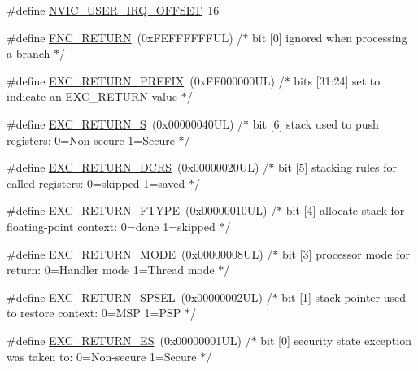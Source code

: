 \begin{DoxyCompactItemize}
\#define \hyperlink{group___c_m_s_i_s___core___n_v_i_c_functions_ga8045d905a5ca57437d8e6f71ffcb6df5}{N\+V\+I\+C\+\_\+\+U\+S\+E\+R\+\_\+\+I\+R\+Q\+\_\+\+O\+F\+F\+S\+ET}~16
\item 
\#define \hyperlink{group___c_m_s_i_s___core___n_v_i_c_functions_gabaa62910bf89acc186ae998c611e64ab}{F\+N\+C\+\_\+\+R\+E\+T\+U\+RN}~(0x\+F\+E\+F\+F\+F\+F\+F\+F\+U\+L)     /$\ast$ bit \mbox{[}0\mbox{]} ignored when processing a branch                             $\ast$/
\item 
\#define \hyperlink{group___c_m_s_i_s___core___n_v_i_c_functions_ga99e0c1c19f050880a8bd827a7f420bec}{E\+X\+C\+\_\+\+R\+E\+T\+U\+R\+N\+\_\+\+P\+R\+E\+F\+IX}~(0x\+F\+F000000\+U\+L)     /$\ast$ bits \mbox{[}31\+:24\mbox{]} set to indicate an E\+X\+C\+\_\+\+R\+E\+T\+U\+R\+N value                     $\ast$/
\item 
\#define \hyperlink{group___c_m_s_i_s___core___n_v_i_c_functions_ga88711355d0196b1ffeb18c33e2c95360}{E\+X\+C\+\_\+\+R\+E\+T\+U\+R\+N\+\_\+S}~(0x00000040\+U\+L)     /$\ast$ bit \mbox{[}6\mbox{]} stack used to push registers\+: 0=\+Non-\/secure 1=\+Secure          $\ast$/
\item 
\#define \hyperlink{group___c_m_s_i_s___core___n_v_i_c_functions_ga0a0f2c03b4aef2c02bdae044bda1324b}{E\+X\+C\+\_\+\+R\+E\+T\+U\+R\+N\+\_\+\+D\+C\+RS}~(0x00000020\+U\+L)     /$\ast$ bit \mbox{[}5\mbox{]} stacking rules for called registers\+: 0=skipped 1=saved       $\ast$/
\item 
\#define \hyperlink{group___c_m_s_i_s___core___n_v_i_c_functions_ga342b51c3eec59822bf206e24ef881a9e}{E\+X\+C\+\_\+\+R\+E\+T\+U\+R\+N\+\_\+\+F\+T\+Y\+PE}~(0x00000010\+U\+L)     /$\ast$ bit \mbox{[}4\mbox{]} allocate stack for floating-\/point context\+: 0=done 1=skipped  $\ast$/
\item 
\#define \hyperlink{group___c_m_s_i_s___core___n_v_i_c_functions_gabb65f847769a7807395b2739cc9702d0}{E\+X\+C\+\_\+\+R\+E\+T\+U\+R\+N\+\_\+\+M\+O\+DE}~(0x00000008\+U\+L)     /$\ast$ bit \mbox{[}3\mbox{]} processor mode for return\+: 0=\+Handler mode 1=\+Thread mode      $\ast$/
\item 
\#define \hyperlink{group___c_m_s_i_s___core___n_v_i_c_functions_ga686922b26c29eac540f53a6213627466}{E\+X\+C\+\_\+\+R\+E\+T\+U\+R\+N\+\_\+\+S\+P\+S\+EL}~(0x00000002\+U\+L)     /$\ast$ bit \mbox{[}1\mbox{]} stack pointer used to restore context\+: 0=\+M\+S\+P 1=\+P\+S\+P           $\ast$/
\item 
\#define \hyperlink{group___c_m_s_i_s___core___n_v_i_c_functions_gac939dbf69d3063c76a28516a4ae84db7}{E\+X\+C\+\_\+\+R\+E\+T\+U\+R\+N\+\_\+\+ES}~(0x00000001\+U\+L)     /$\ast$ bit \mbox{[}0\mbox{]} security state exception was taken to\+: 0=\+Non-\/secure 1=\+Secure $\ast$/

\end{DoxyCompactItemize}
